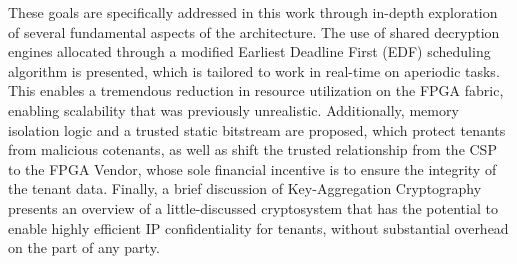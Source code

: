 These goals are specifically addressed in this work through in-depth exploration of several fundamental aspects of the architecture. The use of shared decryption engines allocated through a modified Earliest Deadline First (EDF) scheduling algorithm is presented, which is tailored to work in real-time on aperiodic tasks. This enables a tremendous reduction in resource utilization on the FPGA fabric, enabling scalability that was previously unrealistic. Additionally, memory isolation logic and a trusted static bitstream are proposed, which protect tenants from malicious cotenants, as well as shift the trusted relationship from the CSP to the FPGA Vendor, whose sole financial incentive is to ensure the integrity of the tenant data. Finally, a brief discussion of Key-Aggregation Cryptography presents an overview of a little-discussed cryptosystem that has the potential to enable highly efficient IP confidentiality for tenants, without substantial overhead on the part of any party.